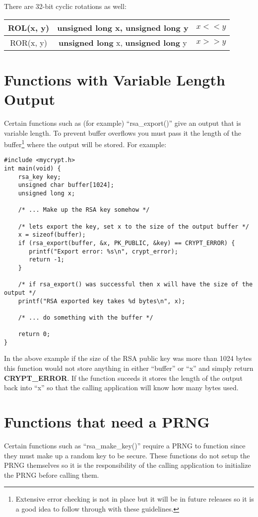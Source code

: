 \documentclass{book}
\begin{document}
There are 32-bit cyclic rotations as well:
 
\begin{center}
\begin{tabular}{|c|c|c|}
     \hline ROL(x, y) & {\bf unsigned long} x, {\bf unsigned long} y & $x << y$ \\
     \hline ROR(x, y) & {\bf unsigned long} x, {\bf unsigned long} y & $x >> y$ \\
     \hline
\end{tabular}
\end{center}

\section{Functions with Variable Length Output}
Certain functions such as (for example) ``rsa\_export()'' give an output that is variable length.  To prevent buffer overflows you
must pass it the length of the buffer\footnote{Extensive error checking is not in place but it will be in future releases so it is a good idea to follow through with these guidelines.} where
the output will be stored.  For example:
\begin{small}
\begin{verbatim}
#include <mycrypt.h>
int main(void) {
    rsa_key key;
    unsigned char buffer[1024];
    unsigned long x;

    /* ... Make up the RSA key somehow */

    /* lets export the key, set x to the size of the output buffer */
    x = sizeof(buffer);
    if (rsa_export(buffer, &x, PK_PUBLIC, &key) == CRYPT_ERROR) {
       printf("Export error: %s\n", crypt_error);
       return -1;
    }
    
    /* if rsa_export() was successful then x will have the size of the output */
    printf("RSA exported key takes %d bytes\n", x);

    /* ... do something with the buffer */

    return 0;
}
\end{verbatim}
\end{small}
In the above example if the size of the RSA public key was more than 1024 bytes this function would not store anything in
either ``buffer'' or ``x'' and simply return {\bf CRYPT\_ERROR}.  If the function suceeds it stores the length of the output
back into ``x'' so that the calling application will know how many bytes used.

\section{Functions that need a PRNG}
Certain functions such as ``rsa\_make\_key()'' require a PRNG to function since they must make up a random key to be
secure.  These functions do not setup the PRNG themselves so it is the responsibility of the calling application to initialize
the PRNG before calling them.
\end{document}
